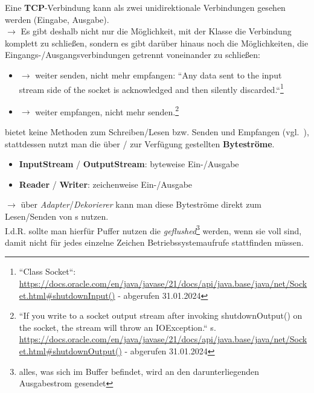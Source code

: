 \noindent
Eine \textbf{TCP}-Verbindung kann als zwei unidirektionale Verbindungen gesehen werden (Eingabe, Ausgabe).\\
$\rightarrow$ Es gibt deshalb nicht nur die Möglichkeit, mit  der Klasse  die Verbindung komplett zu schließen, sondern es gibt darüber hinaus noch die Möglichkeiten, die Eingangs-/Ausgangsverbindungen getrennt voneinander zu schließen:


\begin{itemize}
    \item {} $\rightarrow$ weiter senden, nicht mehr empfangen: ``Any data sent to the input stream side of the socket is acknowledged and then silently discarded.``\footnote{``Class Socket``: \url{https://docs.oracle.com/en/java/javase/21/docs/api/java.base/java/net/Socket.html#shutdownInput()} - abgerufen 31.01.2024
    }
    \item {} $\rightarrow$ weiter empfangen, nicht mehr senden.\footnote{``If you write to a socket output stream after invoking shutdownOutput() on the socket, the stream will throw an IOException.`` s. \url{https://docs.oracle.com/en/java/javase/21/docs/api/java.base/java/net/Socket.html#shutdownOutput()} - abgerufen 31.01.2024
    }
\end{itemize}

\noindent
{} bietet keine Methoden zum Schreiben/Lesen {bzw.} Senden und Empfangen (vgl.~\cite[282]{Oec22}), stattdessen nutzt man die über  /  zur Verfügung gestellten \textbf{Byteströme}.

\begin{tcolorbox}[enlarge top by=0.5cm,enlarge bottom by=0.5cm]
    \begin{itemize}
        \item \textbf{InputStream} / \textbf{OutputStream}: byteweise Ein-/Ausgabe
        \item \textbf{Reader} / \textbf{Writer}: zeichenweise Ein-/Ausgabe
    \end{itemize}
\end{tcolorbox}

\noindent
$\rightarrow$ über \textit{Adapter}/\textit{Dekorierer} kann man diese Byteströme direkt zum Lesen/Senden von s nutzen.\\
I.d.R. sollte man hierfür Puffer nutzen die \textit{geflushed}\footnote{alles, was sich im Buffer befindet, wird an den darunterliegenden Ausgabestrom gesendet} werden, wenn sie voll sind, damit nicht für jedes einzelne Zeichen Betriebssystemaufrufe stattfinden müssen.\\


